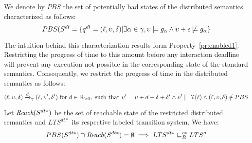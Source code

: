 \begin{definition}
  We denote by $PBS$ the set of potentially bad states of the 
  distributed semantics characterized as follows:
  \[PBS(S^{dt}=\{q^{dt}=(\ell,\upsilon,\delta)|\exists\alpha\in\gamma,\upsilon\models g_{\alpha}\wedge
  \upsilon+\epsilon\not\models g_{\alpha} \} \]
\end{definition}

The intuition behind this characterization results form Property~\ref{pr:enabled1}.
Restricting the progress of time 
to this amount
before any interaction deadline will prevent any execution not possible 
in the corresponding state of the standard semantics.
Consequently, we restrict the progress of
time in the distributed semantics as follows:
\begin{equation}\label{eq:res}
 (\ell,\upsilon,\delta)\xrightarrow{d}_{\gamma}(\ell,\upsilon',\delta') \text{ for } d\in\mathbb{R}_{> 0}, 
      \text{ such that }\upsilon'=\upsilon+d-\delta+\delta'\wedge \upsilon'\models\mathcal{I}(\ell)\wedge
      (\ell,\upsilon,\delta)\notin PBS
\end{equation}

\begin{proposition}\label{prop:esim}
  Let $\textit{Reach}(S^{dt*})$ be the set of reachable state of the restricted distributed semantics 
  and $LTS^{dt*}$ its respective labeled transition system.
  We have: 
  \[PBS(S^{dt*})\cap\textit{Reach}(S^{dt*})=\emptyset\implies LTS^{dt*}\sqsubseteq^{\epsilon*}_{R}LTS^g\]
\end{proposition}


